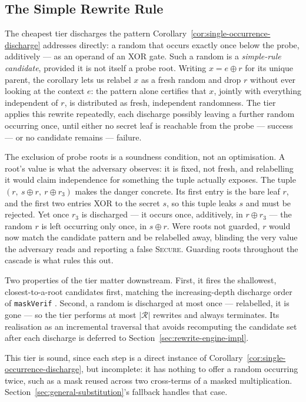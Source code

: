   \subsection{The Simple Rewrite Rule}
  \label{sec:simple-rule}

  The cheapest tier discharges the pattern
  Corollary~\ref{cor:single-occurrence-discharge} addresses directly: a random that
  occurs exactly once below the probe, additively --- as an operand of an XOR gate.
  Such a random is a \emph{simple-rule candidate}, provided it is not itself a probe
  root. Writing $x = e \oplus r$ for its unique parent, the corollary lets us relabel
  $x$ as a fresh random and drop $r$ without ever looking at the context $e$: the
  pattern alone certifies that $x$, jointly with everything independent of $r$, is
  distributed as fresh, independent randomness. The tier applies this rewrite
  repeatedly, each discharge possibly leaving a further random occurring once, until
  either no secret leaf is reachable from the probe --- success --- or no candidate
  remains --- failure.

  The exclusion of probe roots is a soundness condition, not an optimisation. A
  root's value is what the adversary observes: it is fixed, not fresh, and relabelling
  it would claim independence for something the tuple actually exposes. The tuple
  $(r,\ s \oplus r,\ r \oplus r_3)$ makes the danger concrete. Its first entry is the
  bare leaf $r$, and the first two entries XOR to the secret $s$, so this tuple leaks
  $s$ and must be rejected. Yet once $r_3$ is discharged --- it occurs once,
  additively, in $r \oplus r_3$ --- the random $r$ is left occurring only once, in
  $s \oplus r$. Were roots not guarded, $r$ would now match the candidate pattern and
  be relabelled away, blinding the very value the adversary reads and reporting a
  false \textsc{Secure}. Guarding roots throughout the cascade is what rules this out.

  Two properties of the tier matter downstream. First, it fires the shallowest,
  closest-to-a-root candidates first, matching the increasing-depth discharge order
  of \texttt{maskVerif} \parencite{10.1007/978-3-030-29959-0_15}. Second, a random is
  discharged at most once --- relabelled, it is gone --- so the tier performs at most
  $|\mathcal{R}|$ rewrites and always terminates. Its realisation as an incremental
  traversal that avoids recomputing the candidate set after each discharge is deferred
  to Section~\ref{sec:rewrite-engine-impl}.

  This tier is sound, since each step is a direct instance of
  Corollary~\ref{cor:single-occurrence-discharge}, but incomplete: it has nothing to
  offer a random occurring twice, such as a mask reused across two cross-terms of a
  masked multiplication. Section~\ref{sec:general-substitution}'s fallback handles
  that case.

